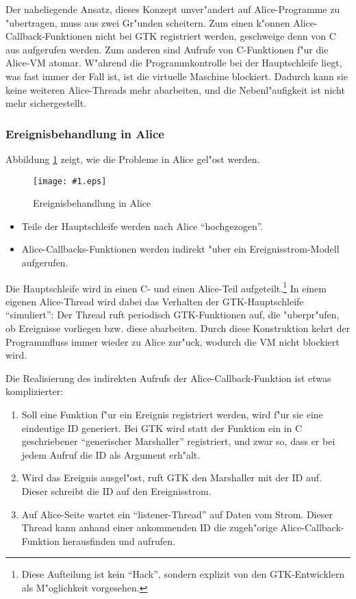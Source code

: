 \documentclass[a4paper,titlepage]{article}
\newcommand{\showimage}[1]{\begin{center}\texttt{[image: \#1.eps]}\end{center}}
\begin{document}
Der naheliegende Ansatz, dieses Konzept unver"andert auf Alice-Programme
zu "ubertragen, muss aus zwei Gr"unden scheitern.
Zum einen k"onnen Alice-Callback-Funktionen nicht bei GTK registriert werden,
geschweige denn von C aus aufgerufen werden.
Zum anderen sind Aufrufe von C-Funktionen f"ur die Alice-VM atomar. 
W"ahrend die
Programmkontrolle bei der Hauptschleife liegt, was fast immer der Fall ist,
ist die virtuelle Maschine blockiert. Dadurch kann sie keine weiteren
Alice-Threads mehr abarbeiten, und die Nebenl"aufigkeit ist nicht mehr
sichergestellt.


\subsubsection*{Ereignisbehandlung in Alice}

Abbildung \ref{EventsAlice} zeigt, wie die Probleme in Alice gel"ost werden.
\begin{figure}
\showimage{events-alice}
\caption{Ereignisbehandlung in Alice}
\label{EventsAlice}
\end{figure}

\begin{itemize}
\item Teile der Hauptschleife werden nach Alice ``hochgezogen''.
\item Alice-Callbacks-Funktionen werden indirekt "uber ein Ereignisstrom-Modell
      aufgerufen.
\end{itemize}

Die Hauptschleife wird in einen C- und einen Alice-Teil aufgeteilt.\footnote{
Diese Aufteilung ist kein ``Hack'', sondern explizit von den
GTK-Entwicklern als M"oglichkeit vorgesehen.}
In einem eigenen Alice-Thread wird dabei das Verhalten
der GTK-Hauptschleife ``simuliert'': Der Thread ruft periodisch
GTK-Funktionen auf, die "uberpr"ufen, ob Ereignisse vorliegen bzw. diese
abarbeiten. Durch diese Konstruktion kehrt der Programmfluss immer wieder
zu Alice zur"uck, wodurch die VM nicht blockiert wird.

Die Realisierung des indirekten Aufrufs der Alice-Callback-Funktion 
ist etwas komplizierter:

\begin{enumerate}
\item Soll eine Funktion f"ur ein Ereignis registriert werden,
      wird f"ur sie eine eindeutige ID generiert. 
      Bei GTK wird statt der Funktion ein in C geschriebener
      ``generischer Marshaller'' registriert, und zwar so, dass er bei jedem
      Aufruf die ID als Argument erh"alt.
\item Wird das Ereignis ausgel"ost, ruft GTK den Marshaller mit der ID auf.
      Dieser schreibt die ID auf den Ereignisstrom.
\item Auf Alice-Seite wartet ein ``listener-Thread'' auf Daten vom Strom.
      Dieser Thread kann anhand einer ankommenden ID die zugeh"orige
      Alice-Callback-Funktion herausfinden und aufrufen.
\end{enumerate}
\end{document}
